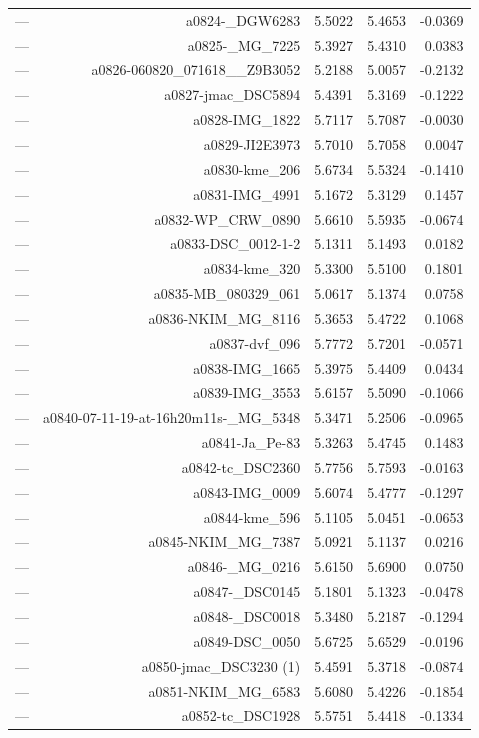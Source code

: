 \begin{table}[htbp]
\begin{tabular}{lrrrr}
— & a0824-_DGW6283 & 5.5022 & 5.4653 & -0.0369 \\
— & a0825-_MG_7225 & 5.3927 & 5.4310 & 0.0383 \\
— & a0826-060820_071618__Z9B3052 & 5.2188 & 5.0057 & -0.2132 \\
— & a0827-jmac_DSC5894 & 5.4391 & 5.3169 & -0.1222 \\
— & a0828-IMG_1822 & 5.7117 & 5.7087 & -0.0030 \\
— & a0829-JI2E3973 & 5.7010 & 5.7058 & 0.0047 \\
— & a0830-kme_206 & 5.6734 & 5.5324 & -0.1410 \\
— & a0831-IMG_4991 & 5.1672 & 5.3129 & 0.1457 \\
— & a0832-WP_CRW_0890 & 5.6610 & 5.5935 & -0.0674 \\
— & a0833-DSC_0012-1-2 & 5.1311 & 5.1493 & 0.0182 \\
— & a0834-kme_320 & 5.3300 & 5.5100 & 0.1801 \\
— & a0835-MB_080329_061 & 5.0617 & 5.1374 & 0.0758 \\
— & a0836-NKIM_MG_8116 & 5.3653 & 5.4722 & 0.1068 \\
— & a0837-dvf_096 & 5.7772 & 5.7201 & -0.0571 \\
— & a0838-IMG_1665 & 5.3975 & 5.4409 & 0.0434 \\
— & a0839-IMG_3553 & 5.6157 & 5.5090 & -0.1066 \\
— & a0840-07-11-19-at-16h20m11s-_MG_5348 & 5.3471 & 5.2506 & -0.0965 \\
— & a0841-Ja_Pe-83 & 5.3263 & 5.4745 & 0.1483 \\
— & a0842-tc_DSC2360 & 5.7756 & 5.7593 & -0.0163 \\
— & a0843-IMG_0009 & 5.6074 & 5.4777 & -0.1297 \\
— & a0844-kme_596 & 5.1105 & 5.0451 & -0.0653 \\
— & a0845-NKIM_MG_7387 & 5.0921 & 5.1137 & 0.0216 \\
— & a0846-_MG_0216 & 5.6150 & 5.6900 & 0.0750 \\
— & a0847-_DSC0145 & 5.1801 & 5.1323 & -0.0478 \\
— & a0848-_DSC0018 & 5.3480 & 5.2187 & -0.1294 \\
— & a0849-DSC_0050 & 5.6725 & 5.6529 & -0.0196 \\
— & a0850-jmac_DSC3230 (1) & 5.4591 & 5.3718 & -0.0874 \\
— & a0851-NKIM_MG_6583 & 5.6080 & 5.4226 & -0.1854 \\
— & a0852-tc_DSC1928 & 5.5751 & 5.4418 & -0.1334 \\

\end{tabular}
\end{table}
